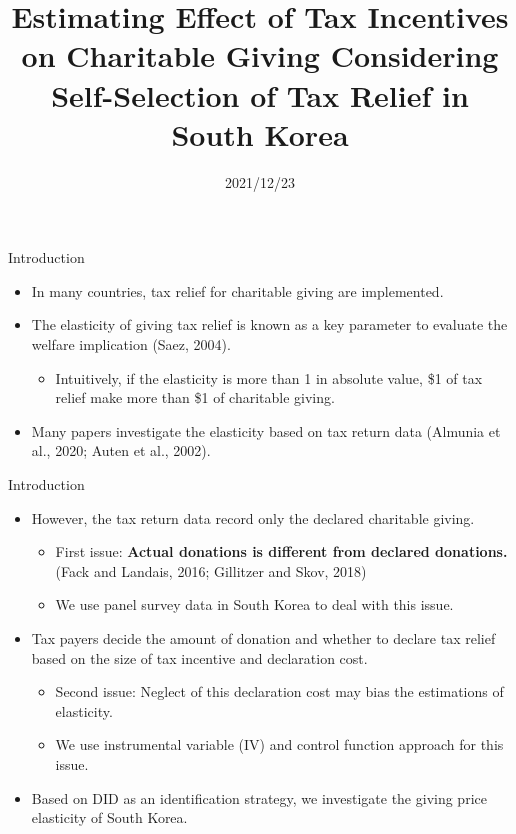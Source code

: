 \documentclass[
  ignorenonframetext,
  aspectratio=169,
]{beamer}
\title{Estimating Effect of Tax Incentives on Charitable Giving Considering Self-Selection of Tax Relief in South Korea  }
\author[shortname]{ Hiroki Kato \inst{1} \and  Tsuyoshi Goto \inst{2} \and  Yong-Rok Kim \inst{3} \and }
\institute[shortinst]{ \inst{1} Osaka University \and  \inst{2} Chiba University \and  \inst{3} Kansai University \and }
\date{2021/12/23}
\providecommand{\tightlist}{%
  \setlength{\itemsep}{0pt}\setlength{\parskip}{0pt}}
\begin{document}
\frame{\titlepage}

\begin{frame}{Introduction}
\protect\hypertarget{introduction}{}
\begin{itemize}
\tightlist
\item
  In many countries, tax relief for charitable giving are implemented.
\item
  The elasticity of giving tax relief is known as a key parameter to evaluate the welfare implication (Saez, 2004).

  \begin{itemize}
  \tightlist
  \item
    Intuitively, if the elasticity is more than 1 in absolute value, \$1 of tax relief make more than \$1 of charitable giving.
  \end{itemize}
\item
  Many papers investigate the elasticity based on tax return data (Almunia et al., 2020; Auten et al., 2002).
\end{itemize}
\end{frame}

\begin{frame}{Introduction}
\protect\hypertarget{introduction-1}{}
\begin{itemize}
\tightlist
\item
  However, the tax return data record only the declared charitable giving.

  \begin{itemize}
  \tightlist
  \item
    First issue: \textbf{Actual donations is different from declared donations.} (Fack and Landais, 2016; Gillitzer and Skov, 2018)
  \item
    We use panel survey data in South Korea to deal with this issue.
  \end{itemize}
\item
  Tax payers decide the amount of donation and whether to declare tax relief based on the size of tax incentive and declaration cost.

  \begin{itemize}
  \tightlist
  \item
    Second issue: Neglect of this declaration cost may bias the estimations of elasticity.
  \item
    We use instrumental variable (IV) and control function approach for this issue.
  \end{itemize}
\item
  Based on DID as an identification strategy, we investigate the giving price elasticity of South Korea.
\end{itemize}
\end{frame}
\end{document}
